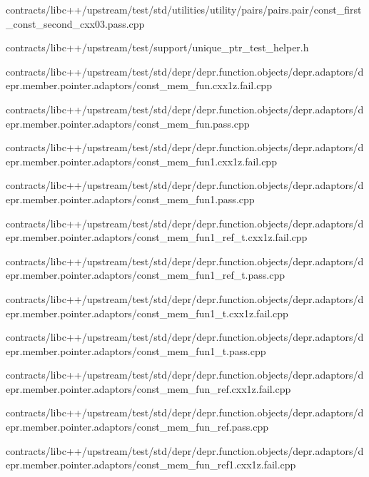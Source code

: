 \begin{DoxyCompactItemize}
contracts/libc++/upstream/test/std/utilities/utility/pairs/pairs.\+pair/const\+\_\+first\+\_\+const\+\_\+second\+\_\+cxx03.\+pass.\+cpp\item 
contracts/libc++/upstream/test/support/unique\+\_\+ptr\+\_\+test\+\_\+helper.\+h\item 
contracts/libc++/upstream/test/std/depr/depr.\+function.\+objects/depr.\+adaptors/depr.\+member.\+pointer.\+adaptors/const\+\_\+mem\+\_\+fun.\+cxx1z.\+fail.\+cpp\item 
contracts/libc++/upstream/test/std/depr/depr.\+function.\+objects/depr.\+adaptors/depr.\+member.\+pointer.\+adaptors/const\+\_\+mem\+\_\+fun.\+pass.\+cpp\item 
contracts/libc++/upstream/test/std/depr/depr.\+function.\+objects/depr.\+adaptors/depr.\+member.\+pointer.\+adaptors/const\+\_\+mem\+\_\+fun1.\+cxx1z.\+fail.\+cpp\item 
contracts/libc++/upstream/test/std/depr/depr.\+function.\+objects/depr.\+adaptors/depr.\+member.\+pointer.\+adaptors/const\+\_\+mem\+\_\+fun1.\+pass.\+cpp\item 
contracts/libc++/upstream/test/std/depr/depr.\+function.\+objects/depr.\+adaptors/depr.\+member.\+pointer.\+adaptors/const\+\_\+mem\+\_\+fun1\+\_\+ref\+\_\+t.\+cxx1z.\+fail.\+cpp\item 
contracts/libc++/upstream/test/std/depr/depr.\+function.\+objects/depr.\+adaptors/depr.\+member.\+pointer.\+adaptors/const\+\_\+mem\+\_\+fun1\+\_\+ref\+\_\+t.\+pass.\+cpp\item 
contracts/libc++/upstream/test/std/depr/depr.\+function.\+objects/depr.\+adaptors/depr.\+member.\+pointer.\+adaptors/const\+\_\+mem\+\_\+fun1\+\_\+t.\+cxx1z.\+fail.\+cpp\item 
contracts/libc++/upstream/test/std/depr/depr.\+function.\+objects/depr.\+adaptors/depr.\+member.\+pointer.\+adaptors/const\+\_\+mem\+\_\+fun1\+\_\+t.\+pass.\+cpp\item 
contracts/libc++/upstream/test/std/depr/depr.\+function.\+objects/depr.\+adaptors/depr.\+member.\+pointer.\+adaptors/const\+\_\+mem\+\_\+fun\+\_\+ref.\+cxx1z.\+fail.\+cpp\item 
contracts/libc++/upstream/test/std/depr/depr.\+function.\+objects/depr.\+adaptors/depr.\+member.\+pointer.\+adaptors/const\+\_\+mem\+\_\+fun\+\_\+ref.\+pass.\+cpp\item 
contracts/libc++/upstream/test/std/depr/depr.\+function.\+objects/depr.\+adaptors/depr.\+member.\+pointer.\+adaptors/const\+\_\+mem\+\_\+fun\+\_\+ref1.\+cxx1z.\+fail.\+cpp\item 

\end{DoxyCompactItemize}
